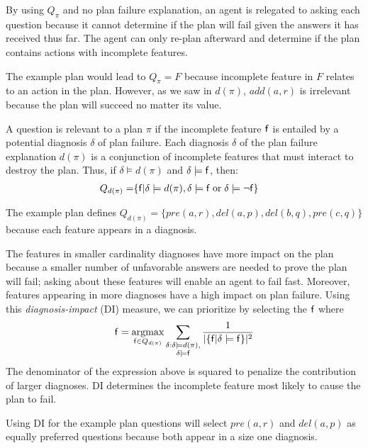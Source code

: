\documentclass{article}
\begin{document}
By using $Q_{\pi}$ and no plan failure explanation, an agent is relegated to
asking each question because it cannot determine if the plan will fail given the
answers it has received thus far.  The agent can only re-plan afterward and
determine if the plan contains actions with incomplete features.

The example plan would lead to $Q_{\pi} = F$ because incomplete feature in
$F$ relates to an action in the plan.  However, as we saw in $d(\pi)$, $add(a,
r)$ is irrelevant because the plan will succeed no matter its value.

  A question is relevant to a plan
${\pi}$ if the incomplete feature ${\sf f}$ is entailed by a potential
diagnosis $\delta$ of plan failure.  Each diagnosis $\delta$ of the plan
failure explanation $d({\pi})$ 
is a conjunction of incomplete features that must interact to destroy the plan. 
Thus, if $\delta \models d({\pi})$ and $\delta \models {\sf f}$, then:  
\begin{align}
Q_{d(\pi)} =&  \{{\sf f} | \delta \models d(\pi)
, \delta \models {\sf f} \;\text{or}\; \delta \models \neg{\sf f}\}\notag
\end{align}

The example plan defines $Q_{d(\pi)} = \{pre(a, r), del(a, p), del(b, q),
pre(c, q) \}$ because each feature appears in a diagnosis.

The features in smaller cardinality diagnoses have more impact on the plan
because a smaller number of unfavorable answers are needed to prove the plan
will fail; asking about these features will enable an agent to fail fast. 
Moreover, features appearing in more diagnoses have a high impact on plan
failure.  Using this {\em diagnosis-impact} (DI) measure, we can prioritize  by selecting the  ${\sf f}$ where 
\begin{align}
{\sf f} = \underset{{\sf f}  \in Q_{d(\pi)}}{\operatorname{argmax}}
\sum\limits_{\substack{\delta : \delta \models d(\pi),\\ \delta\models {\sf
f}}}
\frac{1}{|\{{\sf f}| \delta \models {\sf f}\}|^2}
\notag 
\end{align}
The denominator of the expression above is squared to penalize the contribution
of larger diagnoses.  DI determines the incomplete feature most
likely to cause the plan to fail.

Using DI for the example plan questions will select $pre(a, r)$ and $del(a,
p)$ as equally preferred questions because both appear in a size one diagnosis.
\end{document}
